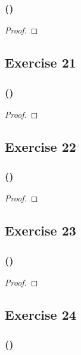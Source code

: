 \documentclass[14pt]{extarticle}
\begin{document}
\subsubsection{()}

\begin{proof}

\end{proof}

\subsection{Exercise 21}

\subsubsection{()}

\begin{proof}

\end{proof}

\subsection{Exercise 22}

\subsubsection{()}

\begin{proof}

\end{proof}

\subsection{Exercise 23}

\subsubsection{()}

\begin{proof}

\end{proof}

\subsection{Exercise 24}

\subsubsection{()}
\end{document}
